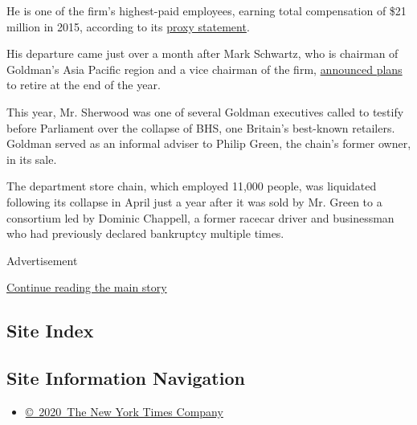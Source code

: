 He is one of the firm's highest-paid employees, earning total
compensation of \$21 million in 2015, according to its
\href{http://www.goldmansachs.com/investor-relations/financials/current/proxy-statements/2016-proxy-statement-pdf.pdf}{proxy
statement}.

His departure came just over a month after Mark Schwartz, who is
chairman of Goldman's Asia Pacific region and a vice chairman of the
firm,
\href{http://www.nytimes3xbfgragh.onion/2016/10/18/business/dealbook/goldman-sachss-asia-pacific-chairman-to-retire.html?rref=collection\%2Ftimestopic\%2FGoldman\%20Sachs\%20Group\&action=click\&contentCollection=business\&region=stream\&module=stream_unit\&version=latest\&contentPlacement=5\&pgtype=collection}{announced
plans} to retire at the end of the year.

This year, Mr. Sherwood was one of several Goldman executives called to
testify before Parliament over the collapse of BHS, one Britain's
best-known retailers. Goldman served as an informal adviser to Philip
Green, the chain's former owner, in its sale.

The department store chain, which employed 11,000 people, was liquidated
following its collapse in April just a year after it was sold by Mr.
Green to a consortium led by Dominic Chappell, a former racecar driver
and businessman who had previously declared bankruptcy multiple times.

Advertisement

\protect\hyperlink{after-bottom}{Continue reading the main story}

\hypertarget{site-index}{%
\subsection{Site Index}\label{site-index}}

\hypertarget{site-information-navigation}{%
\subsection{Site Information
Navigation}\label{site-information-navigation}}

\begin{itemize}
\tightlist
\item
  \href{https://help.nytimes3xbfgragh.onion/hc/en-us/articles/115014792127-Copyright-notice}{©~2020~The
  New York Times Company}
\end{itemize}

